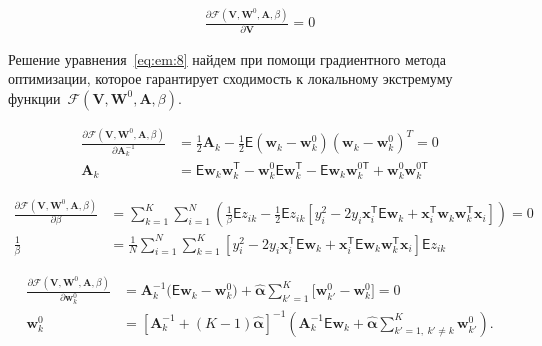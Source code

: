 \documentclass[12pt, twoside]{article}
\numberwithin{equation}{section}
\begin{document}
\begin{equation}
\label{eq:em:8}
\begin{aligned}
	\frac{\partial \mathcal{F}\left(\textbf{V}, \textbf{W}^{0}, \textbf{A}, \beta\right)}{\partial \textbf{V}} = 0
\end{aligned}
\end{equation}

Решение уравнения~\eqref{eq:em:8} найдем при помощи градиентного метода оптимизации, которое гарантирует сходимость к локальному экстремуму функции~$\mathcal{F}\left(\textbf{V}, \textbf{W}^{0}, \textbf{A}, \beta\right)$.

\begin{equation}
\label{eq:em:9}
\begin{aligned}
\frac{\partial \mathcal{F}\left(\textbf{V}, \textbf{W}^{0}, \textbf{A}, \beta\right)}{\partial \textbf{A}^{-1}_k} &=  \frac{1}{2}\textbf{A}_{k} - \frac{1}{2}\mathsf{E}\left(\textbf{w}_{k} - \textbf{w}_{k}^{0}\right)\left(\textbf{w}_{k} - \textbf{w}_{k}^{0}\right)^{T} = 0\\
\textbf{A}_{k} &= \mathsf{E}\textbf{w}_{k}\textbf{w}_{k}^{\mathsf{T}} - \textbf{w}_{k}^{0}\mathsf{E}\textbf{w}_{k}^{\mathsf{T}} - \mathsf{E}\textbf{w}_{k}\textbf{w}_{k}^{0\mathsf{T}} + \textbf{w}_{k}^{0}\textbf{w}_{k}^{0\mathsf{T}} 
\end{aligned}
\end{equation}


\begin{equation}
\label{eq:em:10}
\begin{aligned}
\frac{\partial \mathcal{F}\left(\textbf{V}, \textbf{W}^{0}, \textbf{A}, \beta\right)}{\partial \beta} &= \sum_{k=1}^{K}\sum_{i=1}^{N}\left(\frac{1}{\beta}\mathsf{E}z_{ik}-\frac{1}{2}\mathsf{E}z_{ik}\left[y_{i}^{2}-2y_{i}\textbf{x}_{i}^{\mathsf{T}}\mathsf{E}\textbf{w}_{k}+\textbf{x}_{i}^{\mathsf{T}}\textbf{w}_{k}\textbf{w}_{k}^{\mathsf{T}}\textbf{x}_{i}\right]\right) = 0\\
\frac{1}{\beta}&=\frac{1}{N}\sum_{i=1}^{N}\sum_{k=1}^{K}\left[y_{i}^{2}-2y_{i}\textbf{x}_{i}^{\mathsf{T}}\mathsf{E}\textbf{w}_{k} + \textbf{x}_{i}^{\mathsf{T}}\mathsf{E}\textbf{w}_{k}\textbf{w}_{k}^{\mathsf{T}}\textbf{x}_{i}\right]\mathsf{E}z_{ik}
\end{aligned}
\end{equation}

\begin{equation}
\label{eq:em:11}
\begin{aligned}
\frac{\partial \mathcal{F}\left(\textbf{V}, \textbf{W}^{0}, \textbf{A}, \beta\right)}{\partial \mathbf{w}_k^0} &= \mathbf{A}_k^{-1}\bigr(\mathsf{E}\mathbf{w}_k - \mathbf{w}_{k}^{0}\bigr) + \hat{\bm{\alpha}}\sum_{k'=1}^{K}\bigr[\mathbf{w}_{k'}^{0} -\mathbf{w}_{k}^{0}\bigr] = 0\\
\textbf{w}_{k}^{0} &=\left[\textbf{A}_{k}^{-1}+\left(K-1\right)\hat{\bm{\alpha}}\right]^{-1}\left(\textbf{A}^{-1}_{k}\mathsf{E}\textbf{w}_{k}+\hat{\bm{\alpha}}\sum_{k'=1,~k'\not=k}^{K}\textbf{w}_{k'}^{0}\right).
\end{aligned}
\end{equation}
\end{document}
